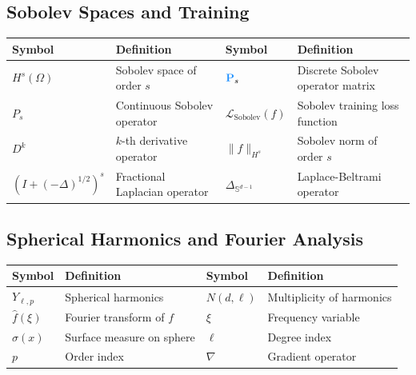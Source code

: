 \documentclass[a4paper]{article}
\theoremstyle{plain}
\theoremstyle{definition}
\theoremstyle{remark}
\begin{document}
\begin{tcolorbox}[colback=blue!5,colframe=blue!50!black,title={\large \textbf{Mathematical Notation Reference (continued)}},enhanced,drop shadow]

\subsection*{Sobolev Spaces and Training}
\begin{longtable}{p{}p{}p{}p{}}
\toprule
\textbf{Symbol} & \textbf{Definition} & \textbf{Symbol} & \textbf{Definition} \\
\midrule
$H^s(\Omega)$ & Sobolev space of order $s$ & $\textcolor{sobolevcolor}{\mathbf{P}}_s$ & Discrete Sobolev operator matrix \\
$P_s$ & Continuous Sobolev operator & $\mathcal{L}_{\text{Sobolev}}(f)$ & Sobolev training loss function \\
$D^k$ & $k$-th derivative operator & $\|f\|_{H^s}$ & Sobolev norm of order $s$ \\
$(I + (-\Delta)^{1/2})^s$ & Fractional Laplacian operator & $\Delta_{\mathbb{S}^{d-1}}$ & Laplace-Beltrami operator \\
\bottomrule
\end{longtable}

\subsection*{Spherical Harmonics and Fourier Analysis}
\begin{longtable}{p{}p{}p{}p{}}
\toprule
\textbf{Symbol} & \textbf{Definition} & \textbf{Symbol} & \textbf{Definition} \\
\midrule
$Y_{\ell,p}$ & Spherical harmonics & $N(d,\ell)$ & Multiplicity of harmonics \\
$\hat{f}(\xi)$ & Fourier transform of $f$ & $\xi$ & Frequency variable \\
$\sigma(x)$ & Surface measure on sphere & $\ell$ & Degree index \\
$p$ & Order index & $\nabla$ & Gradient operator \\
\bottomrule
\end{longtable}


\end{tcolorbox}
\end{document}
